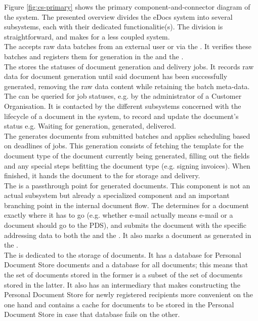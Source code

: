 Figure \ref{fig:cs-primary} shows the primary component-and-connector diagram of the system. The presented overview divides the eDocs system into several subsystems, each with their dedicated functionalitie(s). The division is straightforward, and makes for a less coupled system.\\
The  accepts raw data batches from an external user or via the . It verifies these batches and registers them for generation in the  and the .\\
The  stores the statuses of document generation and delivery jobs. It records raw data for document generation until said document has been successfully generated, removing the raw data content while retaining the batch meta-data. The  can be queried for job statuses, e.g. by the administrator of a Customer Organisation. It is contacted by the different subsystems concerned with the lifecycle of a document in the system, to record and update the document's status e.g. Waiting for generation, generated, delivered.\\
The  generates documents from submitted batches and applies scheduling based on deadlines of jobs. This generation consists of fetching the template for the document type of the document currently being generated, filling out the fields and any special steps befitting the document type (e.g. signing invoices). When finished, it hands the document to the  for storage and delivery.\\
The  is a passthrough point for generated documents. This component is not an actual subsystem but already a specialized component and an important branching point in the internal document flow. The  determines for a document exactly where it has to go (e.g. whether e-mail actually means e-mail or a document should go to the PDS), and submits the document with the specific addressing data to both the  and the . It also marks a document as generated in the .\\
The  is dedicated to the storage of documents. It has a database for Personal Document Store documents and a database for all documents; this means that the set of documents stored in the former is a subset of the set of documents stored in the latter. It also has an intermediary that makes constructing the Personal Document Store for newly registered recipients more convenient on the one hand and contains a cache for documents to be stored in the Personal Document Store in case that database fails on the other.\\
